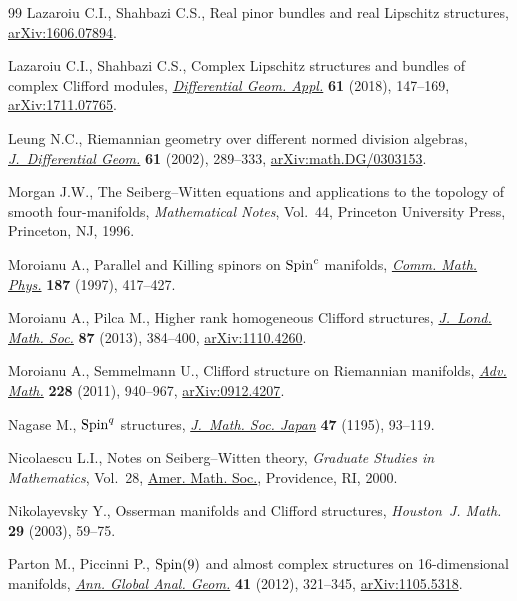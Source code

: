 \documentclass[10pt,a4paper]{amsart}
\numberwithin{equation}{section}
\begin{document}
\begin{thebibliography}{99}
Lazaroiu C.I., Shahbazi C.S., Real pinor bundles and real {L}ipschitz
 structures, \href{https://arxiv.org/abs/1606.07894}{arXiv:1606.07894}.

Lazaroiu C.I., Shahbazi C.S., Complex {L}ipschitz structures and bundles of
 complex {C}lifford modules, \href{https://doi.org/10.1016/j.difgeo.2018.08.006}{\textit{Differential Geom. Appl.}} \textbf{61}
 (2018), 147--169, \href{https://arxiv.org/abs/1711.07765}{arXiv:1711.07765}.

Leung N.C., Riemannian geometry over different normed division algebras,
 \href{https://doi.org/10.4310/jdg/1090351387}{\textit{J.~Differential Geom.}} \textbf{61} (2002), 289--333,
 \href{https://arxiv.org/abs/math.DG/0303153}{arXiv:math.DG/0303153}.

Morgan J.W., The {S}eiberg--{W}itten equations and applications to the topology
 of smooth four-manifolds, \textit{Mathematical Notes}, Vol.~44, Princeton
 University Press, Princeton, NJ, 1996.

Moroianu A., Parallel and {K}illing spinors on {${\rm Spin}^c$} manifolds,
 \href{https://doi.org/10.1007/s002200050142}{\textit{Comm. Math. Phys.}} \textbf{187} (1997), 417--427.

Moroianu A., Pilca M., Higher rank homogeneous {C}lifford structures,
 \href{https://doi.org/10.1112/jlms/jds061}{\textit{J.~Lond. Math. Soc.}} \textbf{87} (2013), 384--400,
 \href{https://arxiv.org/abs/1110.4260}{arXiv:1110.4260}.

Moroianu A., Semmelmann U., Clifford structure on {R}iemannian manifolds,
 \href{https://doi.org/10.1016/j.aim.2011.06.006}{\textit{Adv. Math.}} \textbf{228} (2011), 940--967, \href{https://arxiv.org/abs/0912.4207}{arXiv:0912.4207}.

Nagase M., ${\rm Spin}^q$ structures, \href{https://doi.org/10.2969/jmsj/04710093}{\textit{J.~Math. Soc. Japan}}
 \textbf{47} (1195), 93--119.

Nicolaescu L.I., Notes on {S}eiberg--{W}itten theory, \textit{Graduate Studies
 in Mathematics}, Vol.~28, \href{https://doi.org/10.1090/gsm/028}{Amer. Math. Soc.}, Providence, RI, 2000.

Nikolayevsky Y., Osserman manifolds and {C}lifford structures,
 \textit{Houston~J. Math.} \textbf{29} (2003), 59--75.

Parton M., Piccinni P., {$\rm Spin(9)$} and almost complex structures on
 16-dimensional manifolds, \href{https://doi.org/10.1007/s10455-011-9285-x}{\textit{Ann. Global Anal. Geom.}} \textbf{41}
 (2012), 321--345, \href{https://arxiv.org/abs/1105.5318}{arXiv:1105.5318}.


\end{thebibliography}
\end{document}
